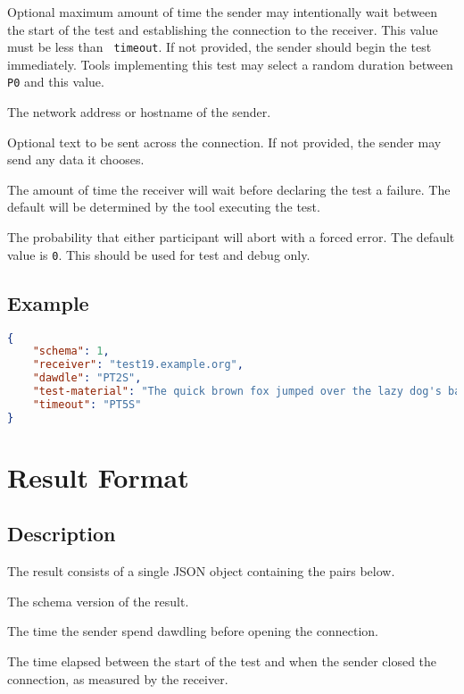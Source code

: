 \documentclass[10pt]{article}
\begin{document}
 Optional maximum amount of time the sender
may intentionally wait between the start of the test and establishing
the connection to the receiver.  This value must be less than {\tt
timeout}.  If not provided, the sender should begin the test
immediately.  Tools implementing this test may select a random
duration between {\tt P0} and this value.

 The network address or hostname of the sender.

 Optional text to be sent across the
connection.  If not provided, the sender may send any data it chooses.

 The amount of time the receiver will wait
before declaring the test a failure.  The default will be determined
by the tool executing the test.

 The probability that either participant
will abort with a forced error.  The default value is {\tt 0}.  This
should be used for test and debug only.


\subsection{Example}
\begin{lstlisting}[language=json]
{
    "schema": 1,
    "receiver": "test19.example.org",
    "dawdle": "PT2S",
    "test-material": "The quick brown fox jumped over the lazy dog's back.",
    "timeout": "PT5S" 
}
\end{lstlisting}



%
%

\section{Result Format}

\subsection{Description}
The result consists of a single JSON object containing the pairs
below.  \seejson

 The schema version of the result.

 The time the sender spend dawdling
before opening the connection.

 The time elapsed between the start
of the test and when the sender closed the connection, as measured by
the receiver.
\end{document}
